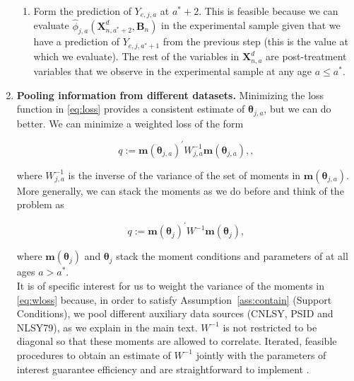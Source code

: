 \begin{enumerate}
\begin{enumerate}
\item Form the prediction of $Y_{e,j,a}$ at $a^* + 2$. This is feasible because we can evaluate $ \hat{\phi}_{j,a}\left( \bm{X}_{n,a^*+2}^d, \bm{B}_{n} \right)$ in the experimental sample given that we have a prediction of $Y_{e,j,a^*+1}$ from the previous step (this is the value at which we evaluate). The rest of the variables in $\bm{X}_{n,a}^d$ are post-treatment variables that we observe in the experimental sample at any age $a \leq a^*$.
\end{enumerate}

\item \textbf{Pooling information from different datasets.} Minimizing the loss function in \eqref{eq:loss} provides a consistent estimate of $\bm{\theta}_{j,a}$, but we can do better. We can minimize a weighted loss of the form 

\begin{equation}
q :=  {\bm{m} \left( \bm{\theta}_{j,a} \right)}^{'} W_{j,a}^{-1} {\bm{m} \left( \bm{\theta}_{j,a} \right)}, \label{eq:wloss},
\end{equation}

\noindent where $W_{j,a}^{-1}$ is the inverse of the variance of the set of moments in $\bm{m} \left( \bm{\theta}_{j,a} \right)$. More generally, we can stack the moments as we do before and think of the problem as 

\begin{equation}
q :=  {\bm{m} \left( \bm{\theta}_{j} \right)}^{'} W ^{-1} {\bm{m} \left( \bm{\theta}_{j}\right)}, \label{eq:wloss}
\end{equation}

\noindent where $\bm{m} \left( \bm{\theta}_{j} \right)$ and  $\bm{\theta}_{j}$  stack the moment conditions and parameters of at all ages $a > a^*$.\\

\noindent It is of specific interest for us to weight the variance of the moments in \eqref{eq:wloss} because, in order to satisfy Assumption~\ref{ass:contain} (Support Conditions), we pool different auxiliary data sources (CNLSY, PSID and NLSY79), as we explain in the main text. $W ^{-1} $ is not restricted to be diagonal so that these moments are allowed to correlate. Iterated, feasible procedures to obtain an estimate of $W ^{-1}$ jointly with the parameters of interest guarantee efficiency and are straightforward to implement \citep{Hansen_1982_Econometrica,Amemiya_1985_advanced}.


\end{enumerate}
